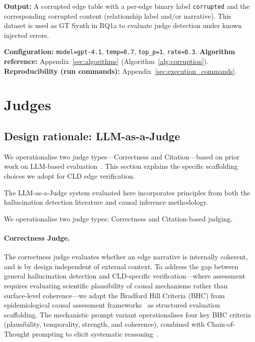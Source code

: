 \textbf{Output:} A corrupted edge table with a per-edge binary label \texttt{corrupted} and the corresponding corrupted content (relationship label and/or narrative). This dataset is used as GT Synth in RQ1a to evaluate judge detection under known injected errors.

\textbf{Configuration:} \texttt{model=gpt-4.1}, \texttt{temp=0.7}, \texttt{top\_p=1}, \texttt{rate=0.3}.
\textbf{Algorithm reference:} Appendix~\ref{sec:algorithms} (Algorithm~\ref{alg:corruption}). \textbf{Reproducibility (run commands):} Appendix~\ref{sec:execution_commands}.

\section{Judges}
\label{sec:judges}

\subsection{Design rationale: LLM-as-a-Judge}
We operationalise two judge types—Correctness and Citation—based on prior work on LLM-based evaluation~\citep{zheng2024judging}. This section explains the specific scaffolding choices we adopt for CLD edge verification.

The LLM-as-a-Judge system evaluated here incorporates principles from both the hallucination detection literature and causal inference methodology.

We operationalise two judge types: Correctness and Citation-based judging.

\paragraph{Correctness Judge.}
The correctness judge evaluates whether an edge narrative is internally coherent, and is by design independent of external context. To address the gap between general hallucination detection and CLD-specific verification---where assessment requires evaluating scientific plausibility of causal mechanisms rather than surface-level coherence---we adapt the Bradford Hill Criteria (BHC) from epidemiological causal assessment frameworks~\citep{shimonovich2020bradford} as structured evaluation scaffolding. The mechanistic prompt variant operationalises four key BHC criteria (plausibility, temporality, strength, and coherence), combined with Chain-of-Thought prompting to elicit systematic reasoning~\citep{wei2022chain, kojima2022large}.

